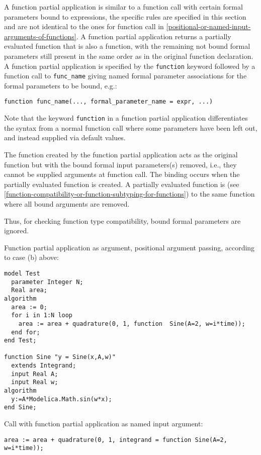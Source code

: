 A function partial application is similar to a function call with
certain formal parameters bound to expressions, the specific rules are
specified in this section and are not identical to the ones for function
call in \autoref{positional-or-named-input-arguments-of-functions}. A function partial application returns a partially
evaluated function that is also a function, with the remaining not bound
formal parameters still present in the same order as in the original
function declaration. A function partial application is specified by the
\lstinline!function! keyword followed by a function call to \lstinline!func_name!
giving named formal parameter associations for the formal parameters to
be bound, e.g.:
\begin{lstlisting}[language=modelica]
  function func_name(..., formal_parameter_name = expr, ...)
\end{lstlisting}

\begin{nonnormative}
Note that the keyword \lstinline!function! in a function partial
application differentiates the syntax from a normal function call
where some parameters have been left out, and instead supplied via
default values.
\end{nonnormative}

The function created by the function partial application acts as the
original function but with the bound formal input parameters(s) removed,
i.e., they cannot be supplied arguments at function call. The binding
occurs when the partially evaluated function is created. A partially
evaluated function is  (see \autoref{function-compatibility-or-function-subtyping-for-functions}) to the
same function where all bound arguments are removed.

\begin{nonnormative}
Thus, for checking function type compatibility, bound formal parameters are ignored.
\end{nonnormative}

\begin{example}
Function partial application as argument, positional argument passing, according to case (b) above:
\begin{lstlisting}[language=modelica]
model Test
  parameter Integer N;
  Real area;
algorithm
  area := 0;
  for i in 1:N loop
    area := area + quadrature(0, 1, function  Sine(A=2, w=i*time));
  end for;
end Test;

function Sine "y = Sine(x,A,w)"
  extends Integrand;
  input Real A;
  input Real w;
algorithm
  y:=A*Modelica.Math.sin(w*x);
end Sine;
\end{lstlisting}
Call with function partial application as named input argument:
\begin{lstlisting}[language=modelica]
area := area + quadrature(0, 1, integrand = function Sine(A=2, w=i*time));
\end{lstlisting}
\end{example}

